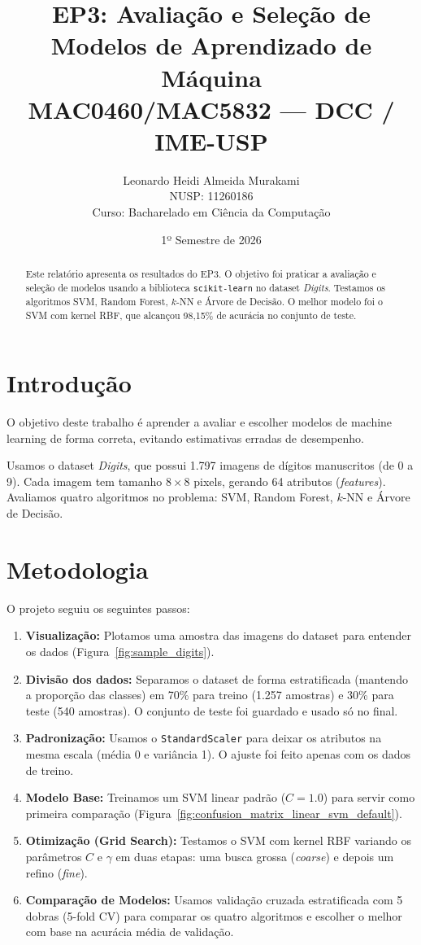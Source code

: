 \documentclass[11pt,a4paper]{article}
\title{EP3: Avaliação e Seleção de Modelos de Aprendizado de Máquina \\
\large MAC0460/MAC5832 — DCC / IME-USP}
\author{Leonardo Heidi Almeida Murakami \\
NUSP: 11260186 \\
Curso: Bacharelado em Ciência da Computação}
\date{1º Semestre de 2026}
\begin{document}
\maketitle

\begin{abstract}
Este relatório apresenta os resultados do EP3. O objetivo foi praticar a avaliação e seleção de modelos usando a biblioteca \texttt{scikit-learn} no dataset \textit{Digits}. Testamos os algoritmos SVM, Random Forest, $k$-NN e Árvore de Decisão. O melhor modelo foi o SVM com kernel RBF, que alcançou 98,15\% de acurácia no conjunto de teste.
\end{abstract}

\section{Introdução}
O objetivo deste trabalho é aprender a avaliar e escolher modelos de machine learning de forma correta, evitando estimativas erradas de desempenho. 

Usamos o dataset \textit{Digits}, que possui 1.797 imagens de dígitos manuscritos (de 0 a 9). Cada imagem tem tamanho $8 \times 8$ pixels, gerando 64 atributos (\textit{features}). Avaliamos quatro algoritmos no problema: SVM, Random Forest, $k$-NN e Árvore de Decisão.

\section{Metodologia}
O projeto seguiu os seguintes passos:

\begin{enumerate}
    \item \textbf{Visualização:} Plotamos uma amostra das imagens do dataset para entender os dados (Figura~\ref{fig:sample_digits}).
    \item \textbf{Divisão dos dados:} Separamos o dataset de forma estratificada (mantendo a proporção das classes) em 70\% para treino (1.257 amostras) e 30\% para teste (540 amostras). O conjunto de teste foi guardado e usado só no final.
    \item \textbf{Padronização:} Usamos o \texttt{StandardScaler} para deixar os atributos na mesma escala (média 0 e variância 1). O ajuste foi feito apenas com os dados de treino.
    \item \textbf{Modelo Base:} Treinamos um SVM linear padrão ($C=1.0$) para servir como primeira comparação (Figura~\ref{fig:confusion_matrix_linear_svm_default}).
    \item \textbf{Otimização (Grid Search):} Testamos o SVM com kernel RBF variando os parâmetros $C$ e $\gamma$ em duas etapas: uma busca grossa (\textit{coarse}) e depois um refino (\textit{fine}).
    \item \textbf{Comparação de Modelos:} Usamos validação cruzada estratificada com 5 dobras (5-fold CV) para comparar os quatro algoritmos e escolher o melhor com base na acurácia média de validação.
\end{enumerate}
\end{document}
